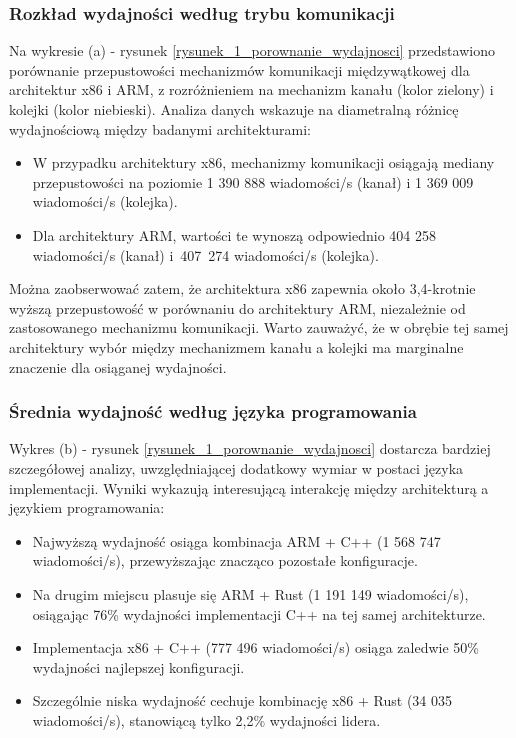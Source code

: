 \subsubsection{Rozkład wydajności według trybu komunikacji}
Na wykresie (a) - rysunek \ref{rysunek_1_porownanie_wydajnosci} przedstawiono porównanie przepustowości mechanizmów komunikacji międzywątkowej dla architektur x86 i ARM, z rozróżnieniem na mechanizm kanału (kolor zielony) i kolejki (kolor niebieski). Analiza danych wskazuje na diametralną różnicę wydajnościową między badanymi architekturami:
\begin{itemize}
    \item W przypadku architektury x86, mechanizmy komunikacji osiągają mediany przepustowości na poziomie 1 390 888 wiadomości/s (kanał) i 1 369 009 wiadomości/s (kolejka).
    \item Dla architektury ARM, wartości te wynoszą odpowiednio 404 258 wiadomości/s (kanał) i~\mbox{407 274} wiadomości/s (kolejka).
\end{itemize}

Można zaobserwować zatem, że architektura x86 zapewnia około 3,4-krotnie wyższą przepustowość w porównaniu do architektury ARM, niezależnie od zastosowanego mechanizmu komunikacji. Warto zauważyć, że w obrębie tej samej architektury wybór między mechanizmem kanału a kolejki ma marginalne znaczenie dla osiąganej wydajności.

\subsubsection{Średnia wydajność według języka programowania}
Wykres (b) - rysunek \ref{rysunek_1_porownanie_wydajnosci} dostarcza bardziej szczegółowej analizy, uwzględniającej dodatkowy wymiar w postaci języka implementacji. Wyniki wykazują interesującą interakcję między architekturą a językiem programowania:
\begin{itemize}
    \item Najwyższą wydajność osiąga kombinacja ARM + C++ (1 568 747 wiadomości/s), przewyższając znacząco pozostałe konfiguracje.
    \item Na drugim miejscu plasuje się ARM + Rust (1 191 149 wiadomości/s), osiągając 76\% wydajności implementacji C++ na tej samej architekturze.
    \item Implementacja x86 + C++ (777 496 wiadomości/s) osiąga zaledwie 50\% wydajności najlepszej konfiguracji.
    \item Szczególnie niska wydajność cechuje kombinację x86 + Rust (34 035 wiadomości/s), stanowiącą tylko 2,2\% wydajności lidera.
\end{itemize}

